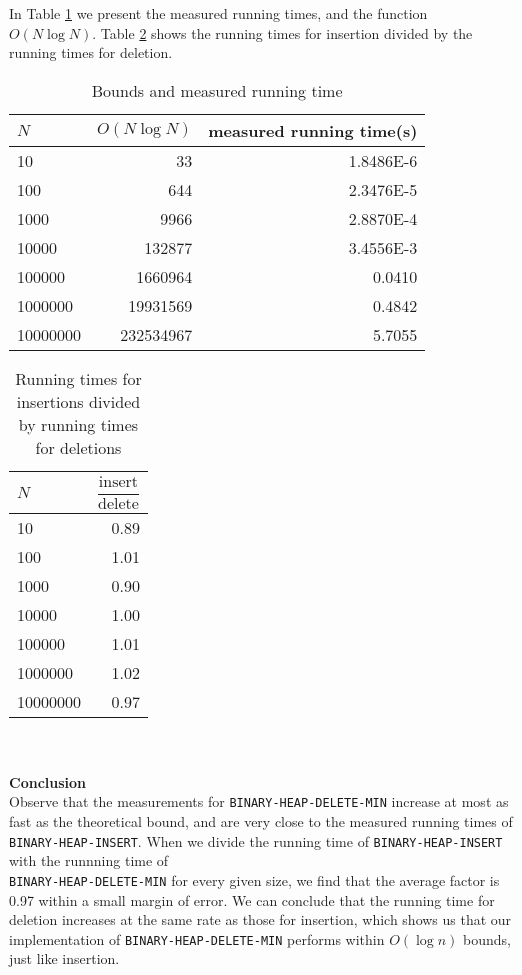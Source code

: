 \documentclass[a4paper,10pt]{article}
\begin{document}
In Table \ref{binary-bounds-meas-run-time-table} we present the measured running times, and the function $O(N\log N)$. Table \ref{bin-ins-div-del} shows the running times for insertion divided by the running times for deletion.
\begin{table}
  \begin{center}
    \begin{tabular}{l|r|r}
      $N$ & $O(N\log N)$ & measured running time(s)\\
      \hline
      10       & 33         & \num{1.8486E-6}\\
      100      & 644        & \num{2.3476E-5}\\
      1000     & 9966       & \num{2.8870E-4}\\
      10000    & 132877     & \num{3.4556E-3}\\
      100000   & 1660964    & \num{0.0410}\\
      1000000  & 19931569   & \num{0.4842}\\
      10000000 & 232534967  & \num{5.7055}
    \end{tabular}
    \caption{Bounds and measured running time}
    \label{binary-bounds-meas-run-time-table}
  \end{center}
\end{table}
\begin{table}
  \begin{center}
    \begin{tabular}{l|r}
      $N$ & $\dfrac{\text{insert}}{\text{delete}}$\\
      \hline
      10       & \num{0.89}\\
      100      & \num{1.01}\\
      1000     & \num{0.90}\\
      10000    & \num{1.00}\\
      100000   & \num{1.01}\\
      1000000  & \num{1.02}\\
      10000000 & \num{0.97}
    \end{tabular}
    \caption{Running times for insertions divided by running times for deletions}
    \label{bin-ins-div-del}
  \end{center}
\end{table}\\\\
{\bf Conclusion}\\
Observe that the measurements for \texttt{BINARY\--HEAP\--DELETE\--MIN} increase at most as fast as the theoretical bound, and are very close to the measured running times of \texttt{BINARY-HEAP-INSERT}. When we divide the running time of \texttt{BINARY\--HEAP\--INSERT} with the runnning time of \\\texttt{BINARY\--HEAP\--DELETE\--MIN} for every given size, we find that the average factor is 0.97 within a small margin of error. We can conclude that the running time for deletion increases at the same rate as those for insertion, which shows us that our implementation of \texttt{BINARY-HEAP-DELETE-MIN} performs within $O(\log n)$ bounds, just like insertion.
\end{document}

